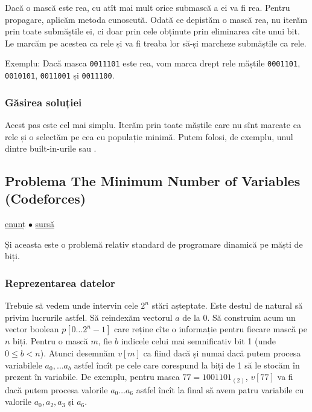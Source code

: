 Dacă o mască este rea, cu atît mai mult orice submască a ei va fi rea. Pentru propagare, aplicăm metoda cunoscută. Odată ce depistăm o mască rea, nu iterăm prin toate submăștile ei, ci doar prin cele obținute prin eliminarea cîte unui bit. Le marcăm pe acestea ca rele și va fi treaba lor să-și marcheze submăștile ca rele.

Exemplu: Dacă masca \texttt{0011101} este rea, vom marca drept rele măștile \texttt{0001101}, \texttt{0010101}, \texttt{0011001} și \texttt{0011100}.

\subsubsection*{Găsirea soluției}

Acest pas este cel mai simplu. Iterăm prin toate măștile care nu sînt marcate ca rele și o selectăm pe cea cu populație minimă. Putem folosi, de exemplu, unul dintre built-in-urile  sau .


\subsection{Problema The Minimum Number of Variables (Codeforces)}
\label{problem:the-minimum-number-of-variables}

\href{https://codeforces.com/contest/279/problem/D}{enunț}
$\bullet$
\hyperref[code:the-minimum-number-of-variables]{sursă}

Și aceasta este o problemă relativ standard de programare dinamică pe măști de biți.

\subsubsection*{Reprezentarea datelor}

Trebuie să vedem unde intervin cele $2^n$ stări așteptate. Este destul de natural să privim lucrurile astfel. Să reindexăm vectorul $a$ de la 0. Să construim acum un vector boolean $p[0 \dots 2^n - 1]$ care reține cîte o informație pentru fiecare mască pe $n$ biți. Pentru o mască $m$, fie $b$ indicele celui mai semnificativ bit 1 (unde $0 \leq b < n$). Atunci desemnăm $v[m]$ ca fiind  dacă și numai dacă putem procesa variabilele $a_0, \dots a_b$ astfel încît pe cele care corespund la biți de 1 să le stocăm în prezent în variabile. De exemplu, pentru masca $77 = 1001101_{(2)}$, $v[77]$ va fi  dacă putem procesa valorile $a_0 \dots a_6$ astfel încît la final să avem patru variabile cu valorile $a_0, a_2, a_3$ și $a_6$.

